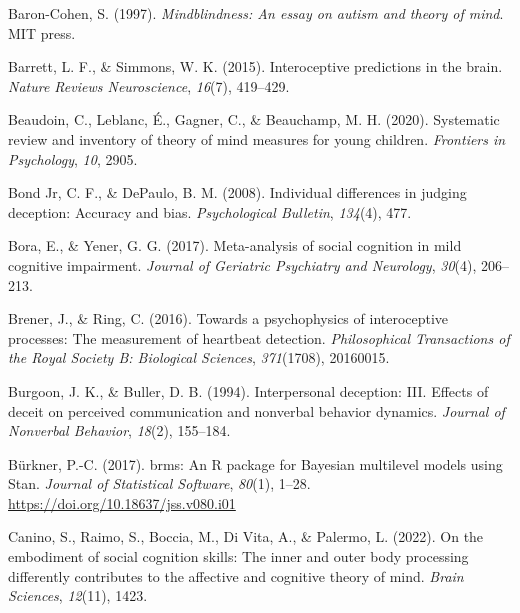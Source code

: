 \documentclass[
  man,mask,floatsintext]{apa6}
\newlength{\cslhangindent}
\newlength{\cslentryspacingunit} %
\newenvironment{CSLReferences}[2] %
 {%
  \setlength{\parindent}{0pt}
  \ifodd #1
  \let\oldpar\par
  \def\par{\hangindent=\cslhangindent\oldpar}
  \fi
  \setlength{\parskip}{#2\cslentryspacingunit}
 }%
 {}
\begin{document}
\hypertarget{refs}{}
\begin{CSLReferences}{1}{0}
\leavevmode{}%
Baron-Cohen, S. (1997). \emph{Mindblindness: An essay on autism and theory of mind}. MIT press.

\leavevmode{}%
Barrett, L. F., \& Simmons, W. K. (2015). Interoceptive predictions in the brain. \emph{Nature Reviews Neuroscience}, \emph{16}(7), 419--429.

\leavevmode{}%
Beaudoin, C., Leblanc, É., Gagner, C., \& Beauchamp, M. H. (2020). Systematic review and inventory of theory of mind measures for young children. \emph{Frontiers in Psychology}, \emph{10}, 2905.

\leavevmode{}%
Bond Jr, C. F., \& DePaulo, B. M. (2008). Individual differences in judging deception: Accuracy and bias. \emph{Psychological Bulletin}, \emph{134}(4), 477.

\leavevmode{}%
Bora, E., \& Yener, G. G. (2017). Meta-analysis of social cognition in mild cognitive impairment. \emph{Journal of Geriatric Psychiatry and Neurology}, \emph{30}(4), 206--213.

\leavevmode{}%
Brener, J., \& Ring, C. (2016). Towards a psychophysics of interoceptive processes: The measurement of heartbeat detection. \emph{Philosophical Transactions of the Royal Society B: Biological Sciences}, \emph{371}(1708), 20160015.

\leavevmode{}%
Burgoon, J. K., \& Buller, D. B. (1994). Interpersonal deception: III. Effects of deceit on perceived communication and nonverbal behavior dynamics. \emph{Journal of Nonverbal Behavior}, \emph{18}(2), 155--184.

\leavevmode{}%
Bürkner, P.-C. (2017). {brms}: An {R} package for {Bayesian} multilevel models using {Stan}. \emph{Journal of Statistical Software}, \emph{80}(1), 1--28. \url{https://doi.org/10.18637/jss.v080.i01}

\leavevmode{}%
Canino, S., Raimo, S., Boccia, M., Di Vita, A., \& Palermo, L. (2022). On the embodiment of social cognition skills: The inner and outer body processing differently contributes to the affective and cognitive theory of mind. \emph{Brain Sciences}, \emph{12}(11), 1423.


\end{CSLReferences}
\end{document}
